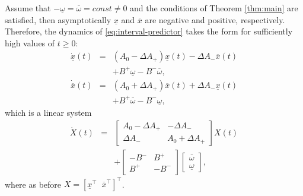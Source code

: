 \begin{remark}
	\begin{leftbar}[remarkbar]
	Assume that $-\underline{\omega}=\overline{\omega}=const\ne0$ and the conditions of Theorem \ref{thm:main} are satisfied, then asymptotically $\underline{x}$ and $\overline{x}$ are negative and positive, respectively. Therefore, the dynamics of \eqref{eq:interval-predictor} takes the form for sufficiently high values of $t\geq0$:
	\begin{eqnarray*}
		\dot{\underline{x}}(t) & = & (A_{0}-\Delta A_{+})\underline{x}(t)-\Delta A_{-}\overline{x}(t)\\
		&  & +B^{+}\underline{\omega}-B^{-}\overline{\omega},\\
		\dot{\overline{x}}(t) & = & (A_{0}+\Delta A_{+})\overline{x}(t)+\Delta A_{-}\underline{x}(t)\\
		&  & +B^{+}\overline{\omega}-B^{-}\underline{\omega},
	\end{eqnarray*}
	which is a linear system
	\begin{eqnarray}
	\label{eq:linear-asympt}
	\dot{X}(t) & = & \left[\begin{array}{cc}
	A_{0}-\Delta A_{+} & -\Delta A_{-}\\
	\Delta A_{-} & A_{0}+\Delta A_{+}
	\end{array}\right]X(t)\\
	&  & +\left[\begin{array}{cc}
	-B^{-} & B^{+}\\
	B^{+} & -B^{-}
	\end{array}\right]\left[\begin{array}{c}
	\overline{\omega}\\
	\underline{\omega}
	\end{array}\right],
	\end{eqnarray}
	where as before $X=[\underline{x}^{\top}\;\;\overline{x}^{\top}]^{\top}$.
	\end{leftbar}
\end{remark}
